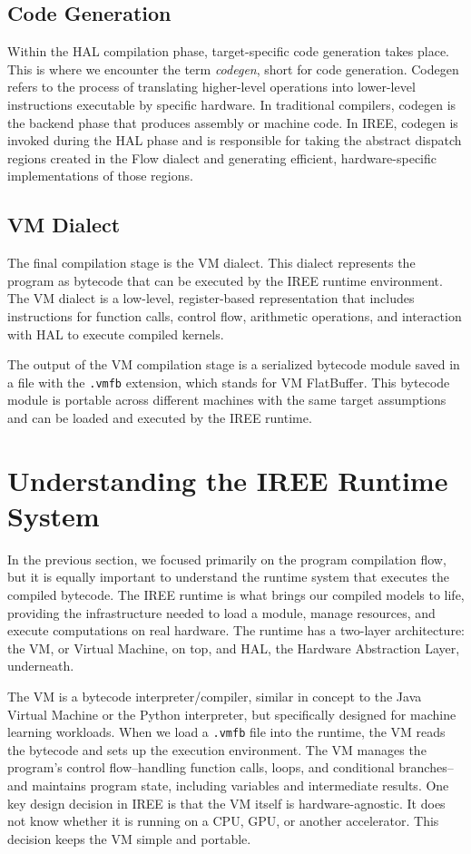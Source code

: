 \documentclass[11pt,a4paper]{article}
\begin{document}
\subsection{Code Generation}

Within the HAL compilation phase, target-specific code generation takes place. This is where we encounter the term \emph{codegen}, short for code generation. Codegen refers to the process of translating higher-level operations into lower-level instructions executable by specific hardware. In traditional compilers, codegen is the backend phase that produces assembly or machine code. In IREE, codegen is invoked during the HAL phase and is responsible for taking the abstract dispatch regions created in the Flow dialect and generating efficient, hardware-specific implementations of those regions.

\subsection{VM Dialect}

The final compilation stage is the VM dialect. This dialect represents the program as bytecode that can be executed by the IREE runtime environment. The VM dialect is a low-level, register-based representation that includes instructions for function calls, control flow, arithmetic operations, and interaction with HAL to execute compiled kernels.

The output of the VM compilation stage is a serialized bytecode module saved in a file with the \texttt{.vmfb} extension, which stands for VM FlatBuffer. This bytecode module is portable across different machines with the same target assumptions and can be loaded and executed by the IREE runtime.

\section{Understanding the IREE Runtime System}

In the previous section, we focused primarily on the program compilation flow, but it is equally important to understand the runtime system that executes the compiled bytecode. The IREE runtime is what brings our compiled models to life, providing the infrastructure needed to load a module, manage resources, and execute computations on real hardware. The runtime has a two-layer architecture: the VM, or Virtual Machine, on top, and HAL, the Hardware Abstraction Layer, underneath.

The VM is a bytecode interpreter/compiler, similar in concept to the Java Virtual Machine or the Python interpreter, but specifically designed for machine learning workloads. When we load a \texttt{.vmfb} file into the runtime, the VM reads the bytecode and sets up the execution environment. The VM manages the program's control flow--handling function calls, loops, and conditional branches--and maintains program state, including variables and intermediate results. One key design decision in IREE is that the VM itself is hardware-agnostic. It does not know whether it is running on a CPU, GPU, or another accelerator. This decision keeps the VM simple and portable.
\end{document}

